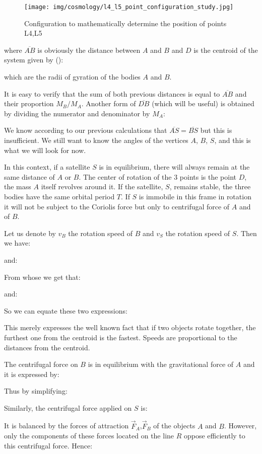 	\begin{figure}[H]
		\centering
		\texttt{[image: img/cosmology/l4\_l5\_point\_configuration\_study.jpg]}	
		\caption[]{Configuration to mathematically determine the position of points L4,L5}
	\end{figure}
	where $\overline{AB}$ is obviously the distance between $A$ and $B$ and $D$ is the centroid of the system given by ():
	
	which are the radii of gyration of the bodies $A$ and $B$.

	It is easy to verify that the sum of both previous distances is equal to $\overline{AB}$ and their proportion $M_B/M_A$. Another form of $\overline{DB}$ (which will be useful) is obtained by dividing the numerator and denominator by $M_A$:
	
	We know according to our previous calculations that $\overline{AS}=\overline{BS}$ but this is insufficient. We still want to know the angles of the vertices $A$, $B$, $S$, and this is what we will look for now.

	In this context, if a satellite $S$ is in equilibrium, there will always remain at the same distance of $A$ or $B$. The center of rotation of the $3$ points is the point $D$, the mass $A$ itself revolves around it. If the satellite, $S$, remains stable, the three bodies have the same orbital period $T$. If $S$ is immobile in this frame in rotation it will not be subject to the Coriolis force but only to centrifugal force of $A$ and of $B$.
	
	Let us denote by $v_B$ the rotation speed of $B$ and $v_S$ the rotation speed of $S$. Then we have:
	
	and:
	
	From whose we get that:
	
	and:
	
	So we can equate these two expressions:
	
	This merely expresses the well known fact that if two objects rotate together, the furthest one from the centroid is the fastest. Speeds are proportional to the distances from the centroid.

	The centrifugal force on $B$ is in equilibrium with the gravitational force of $A$ and it is expressed by:
	
	Thus by simplifying:
	
	Similarly, the centrifugal force applied on $S$ is:
	
	It is balanced by the forces of attraction $\vec{F}_A$,$\vec{F}_B$ of the objects $A$ and $B$. However, only the components of these forces located on the line $R$ oppose efficiently to this centrifugal force. Hence:
	
